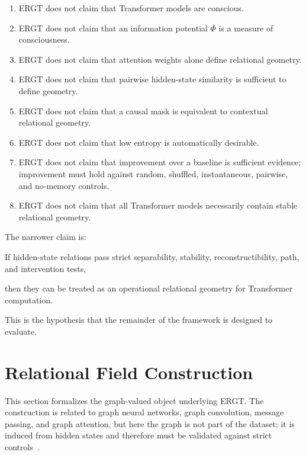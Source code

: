 \documentclass[11pt]{article}
\begin{document}
\begin{enumerate}[leftmargin=2em]
    \item ERGT does not claim that Transformer models are conscious.
    \item ERGT does not claim that an information potential $\Phi$ is a measure of consciousness.
    \item ERGT does not claim that attention weights alone define relational geometry.
    \item ERGT does not claim that pairwise hidden-state similarity is sufficient to define geometry.
    \item ERGT does not claim that a causal mask is equivalent to contextual relational geometry.
    \item ERGT does not claim that low entropy is automatically desirable.
    \item ERGT does not claim that improvement over a baseline is sufficient evidence; improvement must hold against random, shuffled, instantaneous, pairwise, and no-memory controls.
    \item ERGT does not claim that all Transformer models necessarily contain stable relational geometry.
\end{enumerate}

The narrower claim is:
\begin{ergtclaim}
If hidden-state relations pass strict separability, stability, reconstructibility, path, and intervention tests,
\end{ergtclaim}
\begin{ergtclaim}
then they can be treated as an operational relational geometry for Transformer computation.
\end{ergtclaim}

This is the hypothesis that the remainder of the framework is designed to evaluate.



\section{Relational Field Construction}
\noindent This section formalizes the graph-valued object underlying ERGT. The construction is related to graph neural networks, graph convolution, message passing, and graph attention, but here the graph is not part of the dataset; it is induced from hidden states and therefore must be validated against strict controls~\cite{scarselli2009graph,kipf2017semi,gilmer2017neural,velickovic2018graph}.
\end{document}
